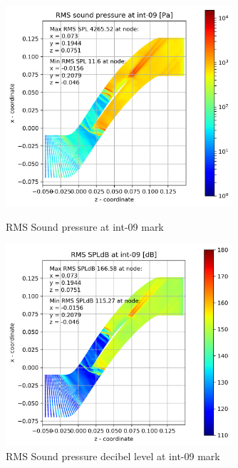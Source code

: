 \begin{figure}[ht]
  \centering
  \includegraphics[width=0.75\textwidth]{Figures/int-09-rms-spl.png}
  \caption{RMS Sound pressure at int-09 mark} \label{int-09-rms-spl}
  
  \vspace*{\floatsep}%

  \includegraphics[width=0.75\textwidth]{Figures/int-09-rms-spldb.png}
  \caption{RMS Sound pressure decibel level at int-09 mark} \label{int-09-rms-spldb}
\end{figure}
